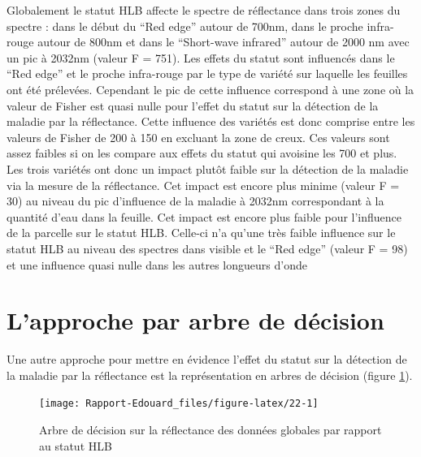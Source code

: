 \documentclass[
  11pt,
  french,
  a4paper,
  extrafontsizes,onecolumn,openright
  ]{memoir}
\begin{document}
\normalsize

Globalement le statut HLB affecte le spectre de réflectance dans trois zones du spectre : dans le début du ``Red edge'' autour de 700nm, dans le proche infra-rouge autour de 800nm et dans le ``Short-wave infrared'' autour de 2000 nm avec un pic à 2032nm (valeur F = 751). Les effets du statut sont influencés dans le ``Red edge'' et le proche infra-rouge par le type de variété sur laquelle les feuilles ont été prélevées. Cependant le pic de cette influence correspond à une zone où la valeur de Fisher est quasi nulle pour l'effet du statut sur la détection de la maladie par la réflectance. Cette influence des variétés est donc comprise entre les valeurs de Fisher de 200 à 150 en excluant la zone de creux. Ces valeurs sont assez faibles si on les compare aux effets du statut qui avoisine les 700 et plus. Les trois variétés ont donc un impact plutôt faible sur la détection de la maladie via la mesure de la réflectance. Cet impact est encore plus minime (valeur F = 30) au niveau du pic d'influence de la maladie à 2032nm correspondant à la quantité d'eau dans la feuille. Cet impact est encore plus faible pour l'influence de la parcelle sur le statut HLB. Celle-ci n'a qu'une très faible influence sur le statut HLB au niveau des spectres dans visible et le ``Red edge'' (valeur F = 98) et une influence quasi nulle dans les autres longueurs d'onde

\vfill
\newpage

\hypertarget{lapproche-par-arbre-de-duxe9cision}{%
\section{L'approche par arbre de décision}\label{lapproche-par-arbre-de-duxe9cision}}

Une autre approche pour mettre en évidence l'effet du statut sur la détection de la maladie par la réflectance est la représentation en arbres de décision (figure \ref{fig:22}).

\scriptsize

\begin{figure}

{\centering \texttt{[image: Rapport-Edouard\_files/figure-latex/22-1]} 

}

\caption{Arbre de décision sur la réflectance des données globales par rapport au statut HLB}\label{fig:22}
\end{figure}

\normalsize
\end{document}
